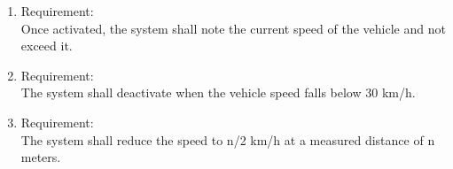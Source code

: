 \begin{enumerate}[label*=\arabic*.]
        \item \label{req.11} Requirement: \\
        Once activated, the system shall note the current speed of the vehicle and not exceed it. \\
        \item \label{req.12} Requirement: \\
        The system shall deactivate when the vehicle speed falls below 30 km/h. \\
        \item \label{req.13} Requirement: \\
        The system shall reduce the speed to n/2 km/h at a measured distance of n meters. \\
	 \end{enumerate}











